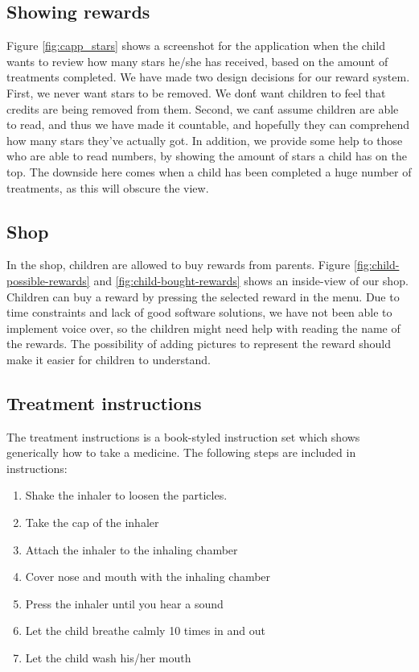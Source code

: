 \subsection{Showing rewards}
\label{sec:description-show-rewards}
Figure \ref{fig:capp_stars} shows a screenshot for the application when the child wants to review how many stars he/she has received, based on the amount of treatments completed. We have made two design decisions for our reward system. First, we never want stars to be removed. We don\'t want children to feel that credits are being removed from them. Second, we can\'t assume children are able to read, and thus we have made it countable, and hopefully they can comprehend how many stars they've actually got. In addition, we provide some help to those who are able to read numbers, by showing the amount of stars a child has on the top. The downside here comes when a child has been completed a huge number of treatments, as this will obscure the view.     

\subsection{Shop}
\label{sec:description-shop}
In the shop, children are allowed to buy rewards from parents. Figure \ref{fig:child-possible-rewards} and \ref{fig:child-bought-rewards} shows an inside-view of our shop. Children can buy a reward by pressing the selected reward in the menu. Due to time constraints and lack of good software solutions, we have not been able to implement voice over, so the children might need help with reading the name of the rewards. The possibility of adding pictures to represent the reward should make it easier for children to understand. 



\subsection{Treatment instructions}
\label{sec:description-instructions}
The treatment instructions is a book-styled instruction set which shows generically how to take a medicine. 
The following steps are included in instructions: 
\begin{enumerate}
  \item Shake the inhaler to loosen the particles. 
  \item Take the cap of the inhaler
  \item Attach the inhaler to the inhaling chamber
  \item Cover nose and mouth with the inhaling chamber
  \item Press the inhaler until you hear a sound
  \item Let the child breathe calmly 10 times in and out
  \item Let the child wash his/her mouth
\end{enumerate} 

